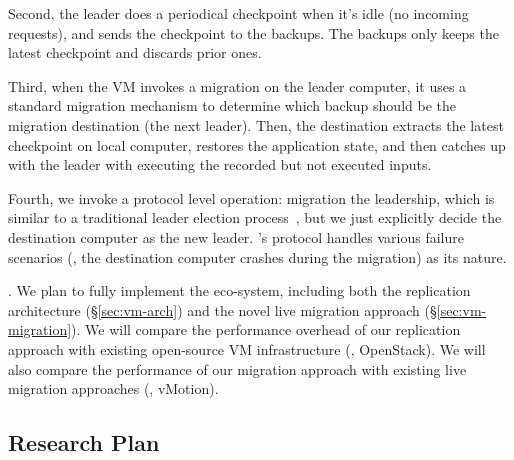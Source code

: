 Second, the leader does a periodical checkpoint when it's idle (no incoming 
requests), and sends the checkpoint to the backups. The backups only keeps 
the latest checkpoint and discards prior ones.

Third, when the VM invokes a migration on the leader computer, it uses a 
standard migration mechanism to determine which backup should be the migration 
destination (the next leader). Then, the destination extracts the latest
checkpoint on local computer, restores the application state, and then catches 
up with the leader with executing the recorded but not executed inputs.

Fourth, we invoke a \falcon protocol level operation: migration the 
leadership, which is similar to a traditional \paxos leader election 
process~\cite{paxos:practical}, but we just explicitly decide the destination 
computer as the new leader. \falcon's protocol handles various failure 
scenarios (\eg, the destination computer crashes during the migration) as its 
\paxos nature.


. We plan to fully implement the eco-system, including both 
the replication architecture (\S\ref{sec:vm-arch}) and the novel live 
migration approach (\S\ref{sec:vm-migration}). We will compare the 
performance overhead of our replication approach with existing open-source VM 
infrastructure (\eg, OpenStack). We will also compare the performance of our 
migration approach with existing live migration approaches (\eg, vMotion).


% 

\vspace{-.15in}\subsection{Research Plan} \label{sec:plan}\vspace{-.075in}

